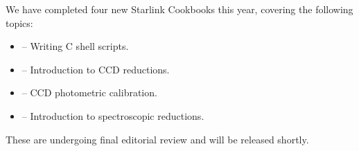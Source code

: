 We have completed four new Starlink Cookbooks this year, covering the
following topics:

\begin{itemize}
\item {} -- Writing C shell scripts.

\item {} -- Introduction to CCD reductions.

\item {} -- CCD photometric calibration.

\item {} -- Introduction to spectroscopic reductions.
\end{itemize}

These are undergoing final editorial review and will be released shortly.


